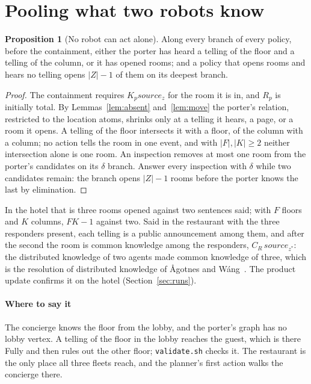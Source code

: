 \documentclass[11pt,a4paper]{article}
\theoremstyle{definition}
\newtheorem{proposition}{Proposition}
\newcommand{\code}[1]{\texttt{\small #1}}
\newcommand{\src}[1]{\mathit{source}_{#1}}
\begin{document}
\section{Pooling what two robots know}
\label{sec:pool}

\begin{proposition}[No robot can act alone]
\label{prop:pool}
Along every branch of every policy, before the containment, either the porter
has heard a telling of the floor and a telling of the column, or it has opened
rooms; and a policy that opens rooms and hears no telling opens $|Z| - 1$ of
them on its deepest branch.
\end{proposition}

\begin{proof}
The containment requires $K_p\src{z}$ for the room it is in, and $R_p$ is
initially total. By Lemmas~\ref{lem:absent} and~\ref{lem:move} the porter's
relation, restricted to the location atoms, shrinks only at a telling it hears,
a page, or a room it opens. A telling of the floor intersects it with a floor,
of the column with a column; no action tells the room in one event, and with
$|F|, |K| \geq 2$ neither intersection alone is one room. An inspection removes
at most one room from the porter's candidates on its $\delta$ branch. Answer
every inspection with $\delta$ while two candidates remain: the branch opens
$|Z| - 1$ rooms before the porter knows the last by elimination.
\end{proof}

In the hotel that is three rooms opened against two sentences said; with $F$
floors and $K$ columns, $FK - 1$ against two. Said in the restaurant with the
three responders present, each telling is a public announcement among them, and
after the second the room is common knowledge among the responders,
$C_R\,\src{z^*}$: the distributed knowledge of two agents made common knowledge
of three, which is the resolution of distributed knowledge of
\AA{}gotnes and W\'ang~\cite{aw2017}. The product update confirms it on the
hotel (Section~\ref{sec:runs}).

\paragraph{Where to say it}
The concierge knows the floor from the lobby, and the porter's graph has no
lobby vertex. A telling of the floor in the lobby reaches the guest, which is
there Fully and then rules out the other floor; \code{validate.sh} checks it.
The restaurant is the only place all three fleets reach, and the planner's first
action walks the concierge there.
\end{document}

